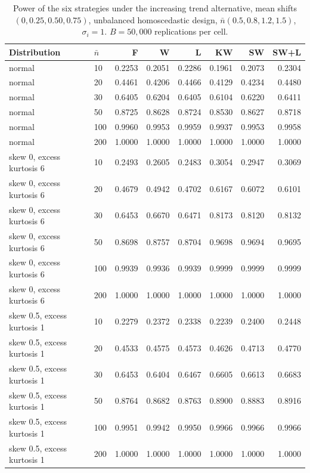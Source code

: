\begin{table}[htbp]
\centering
\caption{Power of the six strategies under the increasing trend alternative, mean shifts $(0, 0.25, 0.50, 0.75)$, unbalanced homoscedastic design, $\bar n(0.5, 0.8, 1.2, 1.5)$, $\sigma_i = 1$. $B = 50{,}000$ replications per cell.}
\begin{tabular}{llrrrrrr}
\hline
Distribution & $\bar n$ & F & W & L & KW & SW & SW+L \\
\hline
normal &  10 & 0.2253 & 0.2051 & 0.2286 & 0.1961 & 0.2073 & 0.2304 \\
normal &  20 & 0.4461 & 0.4206 & 0.4466 & 0.4129 & 0.4234 & 0.4480 \\
normal &  30 & 0.6405 & 0.6204 & 0.6405 & 0.6104 & 0.6220 & 0.6411 \\
normal &  50 & 0.8725 & 0.8628 & 0.8724 & 0.8530 & 0.8627 & 0.8718 \\
normal & 100 & 0.9960 & 0.9953 & 0.9959 & 0.9937 & 0.9953 & 0.9958 \\
normal & 200 & 1.0000 & 1.0000 & 1.0000 & 1.0000 & 1.0000 & 1.0000 \\
skew 0, excess kurtosis 6 &  10 & 0.2493 & 0.2605 & 0.2483 & 0.3054 & 0.2947 & 0.3069 \\
skew 0, excess kurtosis 6 &  20 & 0.4679 & 0.4942 & 0.4702 & 0.6167 & 0.6072 & 0.6101 \\
skew 0, excess kurtosis 6 &  30 & 0.6453 & 0.6670 & 0.6471 & 0.8173 & 0.8120 & 0.8132 \\
skew 0, excess kurtosis 6 &  50 & 0.8698 & 0.8757 & 0.8704 & 0.9698 & 0.9694 & 0.9695 \\
skew 0, excess kurtosis 6 & 100 & 0.9939 & 0.9936 & 0.9939 & 0.9999 & 0.9999 & 0.9999 \\
skew 0, excess kurtosis 6 & 200 & 1.0000 & 1.0000 & 1.0000 & 1.0000 & 1.0000 & 1.0000 \\
skew 0.5, excess kurtosis 1 &  10 & 0.2279 & 0.2372 & 0.2338 & 0.2239 & 0.2400 & 0.2448 \\
skew 0.5, excess kurtosis 1 &  20 & 0.4533 & 0.4575 & 0.4573 & 0.4626 & 0.4713 & 0.4770 \\
skew 0.5, excess kurtosis 1 &  30 & 0.6453 & 0.6404 & 0.6467 & 0.6605 & 0.6613 & 0.6683 \\
skew 0.5, excess kurtosis 1 &  50 & 0.8764 & 0.8682 & 0.8763 & 0.8900 & 0.8883 & 0.8916 \\
skew 0.5, excess kurtosis 1 & 100 & 0.9951 & 0.9942 & 0.9950 & 0.9966 & 0.9966 & 0.9966 \\
skew 0.5, excess kurtosis 1 & 200 & 1.0000 & 1.0000 & 1.0000 & 1.0000 & 1.0000 & 1.0000 \\

\end{tabular}
\end{table}
